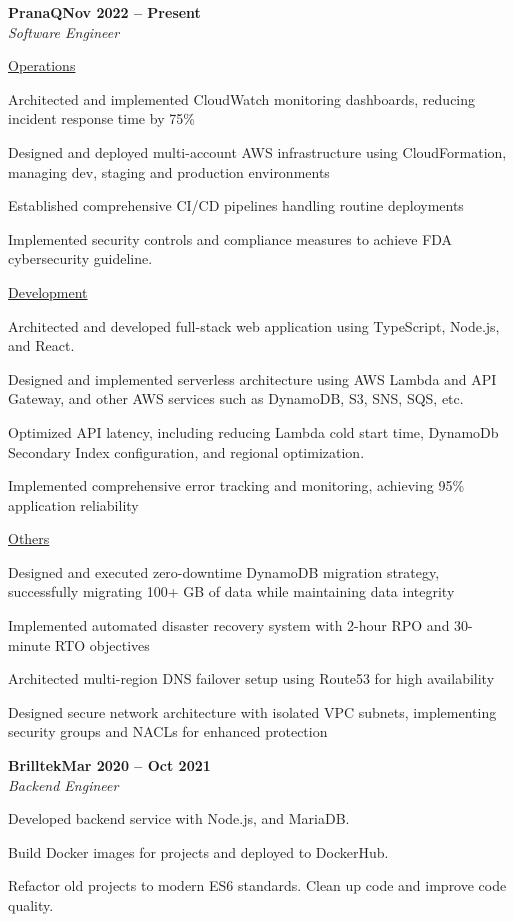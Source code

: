 \documentclass[letterpaper,10pt]{article}
\newcommand{\heading}[2]{
  \hspace{10pt}#1\hfill#2\\
}
\newcommand{\headingBf}[2]{
  \heading{\textbf{#1}}{\textbf{#2}}
}
\newcommand{\headingIt}[2]{
  \heading{\textit{#1}}{\textit{#2}}
}
\newenvironment{resume_list}{
  \vspace{-7pt}
  \begin{itemize}[itemsep=-2px, parsep=1pt, leftmargin=30pt]
}{
  \end{itemize}
}
\newcommand{\itemTitle}[1]{
  \item[] \underline{#1}\vspace{4pt}
}
\begin{document}
  \headingBf{PranaQ}{Nov 2022 -- Present}
  \headingIt{Software Engineer}{}
  \begin{resume_list}
	\vspace{6pt}
	\itemTitle{Operations}
	\item Architected and implemented CloudWatch monitoring dashboards, reducing incident response time by 75\%
	\item Designed and deployed multi-account AWS infrastructure using CloudFormation, managing dev, staging and production environments
	\item Established comprehensive CI/CD pipelines handling routine deployments
	\item Implemented security controls and compliance measures to achieve FDA cybersecurity guideline.
	\vspace{6pt}
	\itemTitle{Development}
	\item Architected and developed full-stack web application using TypeScript, Node.js, and React.
	\item Designed and implemented serverless architecture using AWS Lambda and API Gateway, and other AWS services such as DynamoDB, S3, SNS, SQS, etc.
	\item Optimized API latency, including reducing Lambda cold start time, DynamoDb Secondary Index configuration, and regional optimization.
	\item Implemented comprehensive error tracking and monitoring, achieving 95\% application reliability
	\vspace{6pt}
	\itemTitle{Others}
	\item Designed and executed zero-downtime DynamoDB migration strategy, successfully migrating 100+ GB of data while maintaining data integrity
	\item Implemented automated disaster recovery system with 2-hour RPO and 30-minute RTO objectives
	\item Architected multi-region DNS failover setup using Route53 for high availability
	\item Designed secure network architecture with isolated VPC subnets, implementing security groups and NACLs for enhanced protection
  \end{resume_list}

  \headingBf{Brilltek}{Mar 2020 -- Oct 2021}
  \headingIt{Backend Engineer}{}
  \begin{resume_list}
	\item Developed backend service with Node.js, and MariaDB.
	\item Build Docker images for projects and deployed to DockerHub.
	\item Refactor old projects to modern ES6 standards. Clean up code and improve code quality.
  \end{resume_list}
\end{document}
